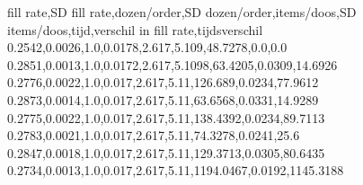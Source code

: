 fill rate,SD fill rate,dozen/order,SD dozen/order,items/doos,SD items/doos,tijd,verschil in fill rate,tijdsverschil
0.2542,0.0026,1.0,0.0178,2.617,5.109,48.7278,0.0,0.0
0.2851,0.0013,1.0,0.0172,2.617,5.1098,63.4205,0.0309,14.6926
0.2776,0.0022,1.0,0.017,2.617,5.11,126.689,0.0234,77.9612
0.2873,0.0014,1.0,0.017,2.617,5.11,63.6568,0.0331,14.9289
0.2775,0.0022,1.0,0.017,2.617,5.11,138.4392,0.0234,89.7113
0.2783,0.0021,1.0,0.017,2.617,5.11,74.3278,0.0241,25.6
0.2847,0.0018,1.0,0.017,2.617,5.11,129.3713,0.0305,80.6435
0.2734,0.0013,1.0,0.017,2.617,5.11,1194.0467,0.0192,1145.3188
